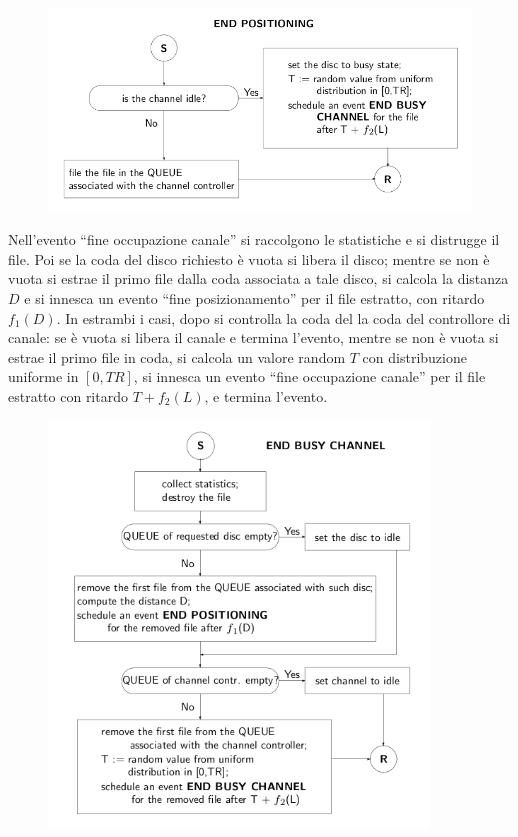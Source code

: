 \documentclass[11pt]{book}
\begin{document}
\begin{figure}[H]
  \centering
  \includegraphics[width=\textwidth]{images/cap11fig30.png}
\end{figure}

Nell'evento ``fine occupazione canale'' si raccolgono le statistiche e
si distrugge il file. Poi se la coda del disco richiesto \`e vuota si
libera il disco; mentre se non \`e vuota si estrae il primo file dalla
coda associata a tale disco, si calcola la distanza $D$ e si innesca
un evento ``fine posizionamento'' per il file estratto, con ritardo
$f_1(D)$. In estrambi i casi, dopo si controlla la coda del la coda
del controllore di canale: se \`e vuota si libera il canale e termina
l'evento, mentre se non \`e vuota si estrae il primo file in coda, si
calcola un valore random $T$ con distribuzione uniforme in $[0,TR]$,
si innesca un evento ``fine occupazione canale'' per il file estratto
con ritardo $T+f_2(L)$, e termina l'evento.

\begin{figure}[H]
  \centering
  \includegraphics[width=0.9\textwidth]{images/cap11fig31.png}
\end{figure}
\end{document}
